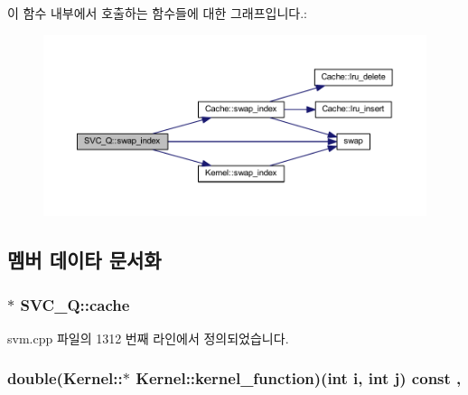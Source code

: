 이 함수 내부에서 호출하는 함수들에 대한 그래프입니다.\+:
\nopagebreak
\begin{figure}[H]
\begin{center}
\leavevmode
\includegraphics[width=350pt]{class_s_v_c___q_a9c889db8ee0156ed5bcdaa4d6bc4e245_cgraph}
\end{center}
\end{figure}




\subsection{멤버 데이타 문서화}
\hypertarget{class_s_v_c___q_a70e4787695cadf49495accdd36fb140f}{
\subsubsection[{cache}]{$\ast$ S\+V\+C\+\_\+\+Q\+::cache\hspace{0.3cm}{\ttfamily [private]}}}\label{class_s_v_c___q_a70e4787695cadf49495accdd36fb140f}


svm.\+cpp 파일의 1312 번째 라인에서 정의되었습니다.

\hypertarget{class_kernel_a575eeb588e8a5c62ff3228a35e255a02}{
\subsubsection[{kernel\+\_\+function}]{\setlength{\rightskip}{0pt plus 5cm}double(Kernel\+::$\ast$ Kernel\+::kernel\+\_\+function)(int i, int j) const \hspace{0.3cm}{\ttfamily [protected]}, {\ttfamily [inherited]}}}\label{class_kernel_a575eeb588e8a5c62ff3228a35e255a02}


